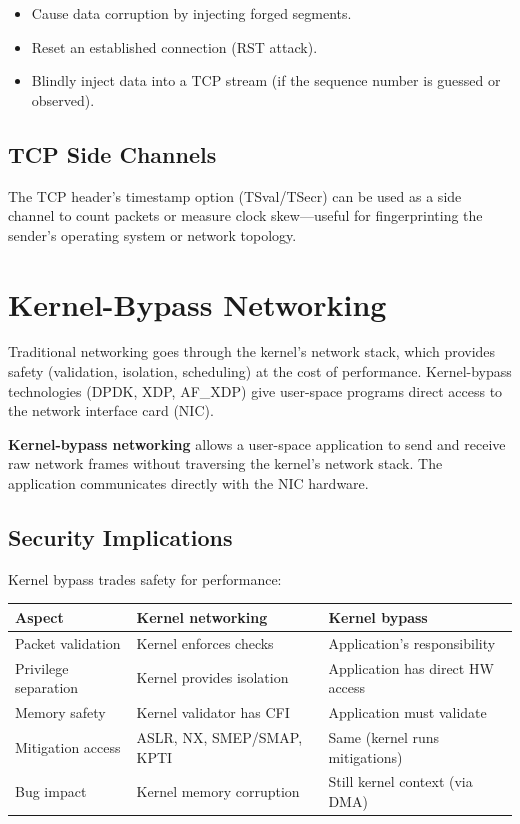 \begin{itemize}
	\item Cause data corruption by injecting forged segments.
	\item Reset an established connection (RST attack).
	\item Blindly inject data into a TCP stream (if the sequence number is guessed or observed).
\end{itemize}

\subsection{TCP Side Channels}

The TCP header's timestamp option (TSval/TSecr) can be used as a side channel to count packets or measure clock skew---useful for fingerprinting the sender's operating system or network topology.

\section{Kernel-Bypass Networking}

Traditional networking goes through the kernel's network stack, which provides safety (validation, isolation, scheduling) at the cost of performance. Kernel-bypass technologies (DPDK, XDP, AF\_XDP) give user-space programs direct access to the network interface card (NIC).

\begin{definition}
	\textbf{Kernel-bypass networking} allows a user-space application to send and receive raw network frames without traversing the kernel's network stack. The application communicates directly with the NIC hardware.
\end{definition}

\subsection{Security Implications}

Kernel bypass trades safety for performance:

\begin{longtable}{p{3.5cm}p{5cm}p{4cm}}
	\toprule
	\textbf{Aspect}      & \textbf{Kernel networking} & \textbf{Kernel bypass}           \\
	\midrule
	Packet validation    & Kernel enforces checks     & Application's responsibility     \\
	Privilege separation & Kernel provides isolation  & Application has direct HW access \\
	Memory safety        & Kernel validator has CFI   & Application must validate        \\
	Mitigation access    & ASLR, NX, SMEP/SMAP, KPTI  & Same (kernel runs mitigations)   \\
	Bug impact           & Kernel memory corruption   & Still kernel context (via DMA)   \\
	\bottomrule
\end{longtable}

